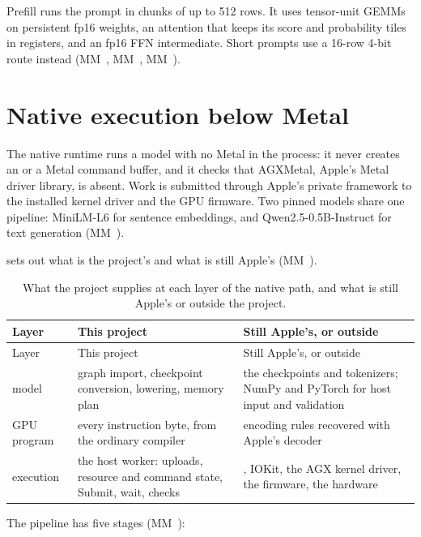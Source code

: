 Prefill runs the prompt in chunks of up to 512 rows. It uses tensor-unit GEMMs on persistent fp16 weights, an
attention that keeps its score and probability tiles in registers, and an fp16 FFN intermediate. Short prompts use a
16-row 4-bit route instead (MM~, MM~, MM~).

\section{Native execution below Metal}\label{ch:below-metal-native}

The native runtime runs a model with no Metal in the process: it never creates an  or a Metal command
buffer, and it checks that AGXMetal, Apple's Metal driver library, is absent. Work is submitted through Apple's private
 framework to the installed kernel driver and the GPU firmware. Two pinned models share one pipeline:
MiniLM-L6 for sentence embeddings, and Qwen2.5-0.5B-Instruct for text generation (MM~).

 sets out what is the project's and what is still Apple's (MM~).

\begin{xltabular}{\linewidth}{@{}lXX@{}}
\caption{What the project supplies at each layer of the native path, and what is still Apple's or outside the project.}\label{tab:native-path-ownership}\\
\toprule
Layer & This project & Still Apple's, or outside \\
\midrule
\endfirsthead
{}
\toprule
Layer & This project & Still Apple's, or outside \\
\midrule
\endhead
model & graph import, checkpoint conversion, lowering, memory plan & the checkpoints and tokenizers; NumPy and PyTorch for host input and
validation \\*
GPU program & every instruction byte, from the ordinary compiler & encoding rules recovered with Apple's decoder \\*
execution & the host worker: uploads, resource and command state, Submit, wait,
checks & , IOKit, the AGX kernel driver, the firmware, the
hardware \\*
\bottomrule
\end{xltabular}

The pipeline has five stages (MM~):

